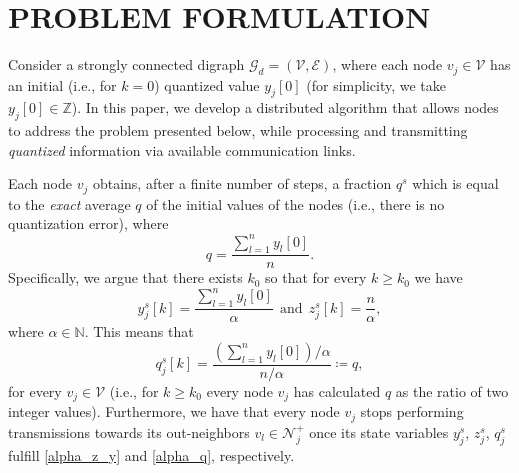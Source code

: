 \documentclass[twocolumn]{autart}    %
\let\mathbb=\mathds %
\begin{document}
\section{PROBLEM FORMULATION}\label{probForm}


Consider a strongly connected digraph $\mathcal{G}_d = (\mathcal{V}, \mathcal{E})$, where each node $v_j \in \mathcal{V}$ has an initial (i.e., for $k=0$) quantized value $y_j[0]$ (for simplicity, we take $y_j[0] \in \mathbb{Z}$). 
In this paper, we develop a distributed algorithm that allows nodes to address the problem presented below, while processing and transmitting \textit{quantized} information via available communication links. 

Each node $v_j$ obtains, after a finite number of steps, a fraction $q^s$ which is equal to the \textit{exact} average $q$ of the initial values of the nodes (i.e., there is no quantization error), where
\begin{equation}
q = \frac{\sum_{l=1}^{n}{y_l[0]}}{n} .
\end{equation}
Specifically, we argue that there exists $k_0$ so that for every $k \geq k_0$ we have 
\begin{equation}\label{alpha_z_y}
y^s_j[k] = \frac{\sum_{l=1}^{n}{y_l[0]}}{\alpha}  \ \ \text{and} \ \ z^s_j[k] = \frac{n}{\alpha} ,
\end{equation}
where $\alpha \in \mathbb{N}$. This means that 
\begin{equation}\label{alpha_q}
q^s_j[k] = \frac{(\sum_{l=1}^{n}{y_l[0]}) / \alpha}{n / \alpha} \coloneqq q ,
\end{equation}
for every $v_j \in \mathcal{V}$ (i.e., for $k \geq k_0$ every node $v_j$ has calculated $q$ as the ratio of two integer values). 
Furthermore, we have that every node $v_j$ stops performing transmissions towards its out-neighbors $v_l \in \mathcal{N}^+_j$ once its state variables $y^s_j$, $z^s_j$, $q^s_j$ fulfill \eqref{alpha_z_y} and \eqref{alpha_q}, respectively. 


\end{document}
